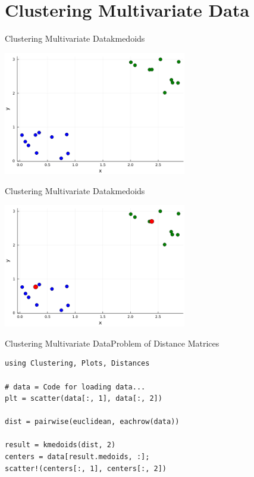 \documentclass[11pt]{beamer}
\begin{document}
\section{Clustering Multivariate Data}
\begin{frame}[fragile]{Clustering Multivariate Data}{kmedoids}
	\begin{center}
		\includegraphics[width=8cm]{images/kmedoids1.png}
	\end{center}
\end{frame}

\begin{frame}[fragile]{Clustering Multivariate Data}{kmedoids}
	\begin{center}
		\includegraphics[width=8cm]{images/kmedoids2.png}
	\end{center}
\end{frame}

\begin{frame}[fragile]{Clustering Multivariate Data}{Problem of Distance Matrices}
\begin{lstlisting}
using Clustering, Plots, Distances

# data = Code for loading data...
plt = scatter(data[:, 1], data[:, 2])

dist = pairwise(euclidean, eachrow(data))

result = kmedoids(dist, 2)
centers = data[result.medoids, :];
scatter!(centers[:, 1], centers[:, 2])
\end{lstlisting}
\end{frame}
\end{document}
